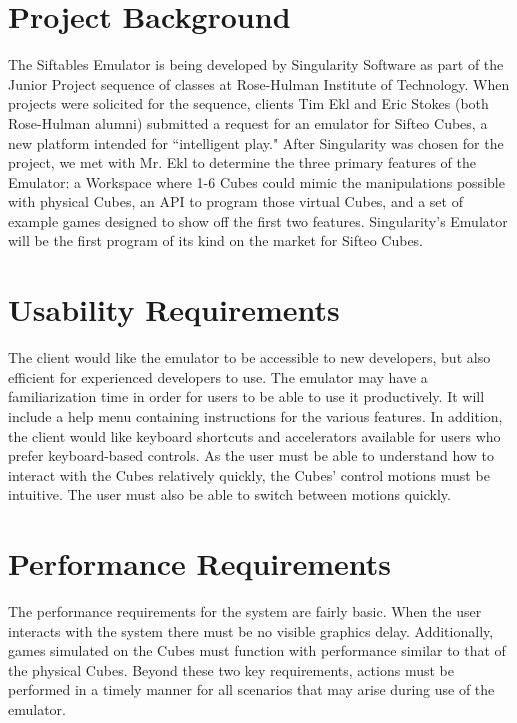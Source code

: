 \documentclass[12pt]{article}
\begin{document}
\section{Project Background}
The Siftables Emulator is being developed by Singularity Software as part of the Junior Project sequence of classes at Rose-Hulman Institute of Technology. When projects were solicited for the sequence, clients Tim Ekl and Eric Stokes (both Rose-Hulman alumni) submitted a request for an emulator for Sifteo Cubes, a new platform intended for ``intelligent play." After Singularity was chosen for the project, we met with Mr. Ekl to determine the three primary features of the Emulator: a Workspace where 1-6 Cubes could mimic the manipulations possible with physical Cubes, an \gls{API} to program those virtual Cubes, and a set of example games designed to show off the first two features. Singularity's Emulator will be the first program of its kind on the market for Sifteo Cubes.

\section{Usability Requirements}
The client would like the emulator to be accessible to new developers, but also efficient for experienced developers to use. The emulator may have a familiarization time in order for users to be able to use it productively. It will include a help menu containing instructions for the various features. In addition, the client would like keyboard shortcuts and accelerators available for users who prefer keyboard-based controls. As the user must be able to understand how to interact with the Cubes relatively quickly, the Cubes' control motions must be intuitive. The user must also be able to switch between motions quickly.

\section{Performance Requirements}
The performance requirements for the system are fairly basic. When the user interacts with the system there must be no visible graphics delay. Additionally, games simulated on the Cubes must function with performance similar to that of the physical Cubes. Beyond these two key requirements, actions must be performed in a timely manner for all scenarios that may arise during use of the emulator.
\end{document}

